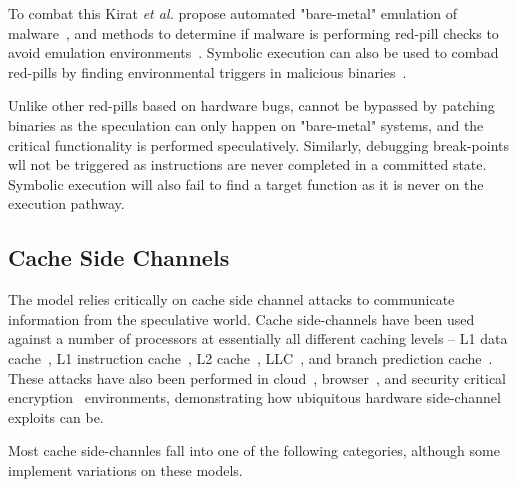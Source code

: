 To combat this Kirat \textit{et al.} propose automated "bare-metal" 
emulation of malware~\cite{kirat2011barebox}, and methods to determine if malware
is performing red-pill checks to avoid emulation environments~\cite{kirat2014barecloud}.
Symbolic execution can also be used to combad red-pills by finding environmental triggers 
in malicious binaries~\cite{schwartz2010all}. 

\smallskip

Unlike other red-pills based on hardware bugs, \speculake cannot be bypassed
by patching binaries as the speculation can only happen on "bare-metal" systems, 
and the critical functionality is performed speculatively. Similarly, debugging 
break-points wll not be triggered as instructions are never completed in a committed state.
Symbolic execution will also fail to find a target function as it is never on the 
execution pathway. 



\subsection{Cache Side Channels}

The \speculake model relies critically on cache side channel attacks to 
communicate information from the speculative world. Cache side-channels have 
been used against a number of processors at essentially all different 
caching levels -- L1 data cache~\cite{percival2005cache,zhang2012cross,osvik2006cache}, 
L1 instruction cache~\cite{aciiccmez2010new}, 
L2 cache~\cite{ristenpart2009hey,percival2005cache}, 
LLC~\cite{ristenpart2009hey,liu2015last}, 
and branch prediction cache~\cite{aciiccmez2007power}. 
These attacks have also been performed in 
cloud~\cite{ristenpart2009hey,zhang2012cross}, 
browser~\cite{oren2015spy,google_cache_browser},
and security critical encryption~\cite{yarom2014recovering,tromer2010efficient}
environments, demonstrating how ubiquitous hardware side-channel exploits can be. 

Most cache side-channles fall into one of the following categories, although
some implement variations on these models.

